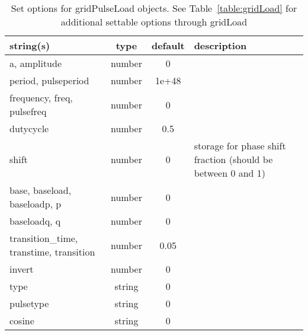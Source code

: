 \begin{table}[ht]
\centering
\begin{tabular}{p{5cm} c c p{7cm}}
\hline
string(s) & type & default & description \\
\hline
a, amplitude & number & 0 & \\
period, pulseperiod & number & 1e+48 & \\
frequency, freq, pulsefreq & number & 0 & \\
dutycycle & number & 0.5 & \\
shift & number & 0 & storage for phase shift fraction (should be between 0 and 1)\\
base, baseload, baseloadp, p & number & 0 & \\
baseloadq, q & number & 0 & \\
transition\_time, transtime, transition & number & 0.05 & \\
invert & number & 0 & \\
type & string & 0 & \\
pulsetype & string & 0 & \\
cosine & string & 0 & \\
\hline
\end{tabular}
\caption{Set options for gridPulseLoad objects. See Table~\ref{table:gridLoad} for additional settable options through gridLoad}
\label{table:gridPulseLoad}
\end{table}

